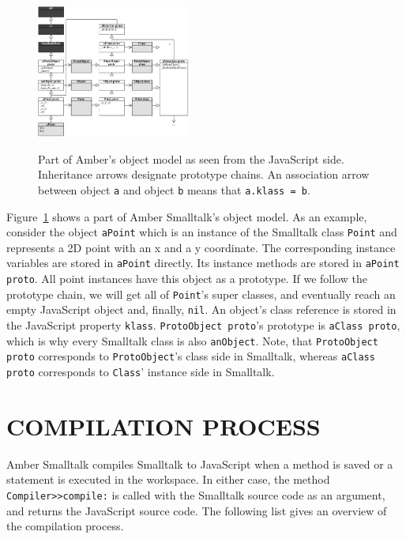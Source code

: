 \documentclass[english,paper=a4,twocolumn=true,DIV=calc,fontsize=9pt]{scrartcl}
\begin{document}
\begin{figure}
\centering
\includegraphics[width=0.45\textwidth]{amber_class_model}
\label{fig:amber_obj}
\caption{Part of Amber's object model as seen from the JavaScript side. Inheritance arrows designate prototype chains. An association arrow between object \texttt{a} and object \texttt{b} means that \texttt{a.klass = b}.}
\end{figure}

Figure~\ref{fig:amber_obj} shows a part of Amber Smalltalk's object model. As an example, consider the object \texttt{aPoint} which is an instance of the Smalltalk class \texttt{Point} and represents a 2D point with an x and a y coordinate. The corresponding instance variables are stored in \texttt{aPoint} directly. Its instance methods are stored in \texttt{aPoint proto}. All point instances have this object as a prototype. If we follow the prototype chain, we will get all of  \texttt{Point}'s super classes, and eventually reach an empty JavaScript object and, finally, \texttt{nil}. An object's class reference is stored in the JavaScript property \texttt{klass}. \texttt{ProtoObject proto}'s prototype is \texttt{aClass proto}, which is why every Smalltalk class is also \texttt{anObject}. Note, that \texttt{ProtoObject proto} corresponds to \texttt{ProtoObject}'s class side in Smalltalk, whereas \texttt{aClass proto} corresponds to \texttt{Class}' instance side in Smalltalk.


\section{COMPILATION PROCESS}
Amber Smalltalk compiles Smalltalk to JavaScript when a method is saved or a statement is executed in the workspace. In either case, the method \texttt{Compiler>>compile:} is called with the Smalltalk source code as an argument, and returns the JavaScript source code. The following list gives an overview of the compilation process.
\end{document}
